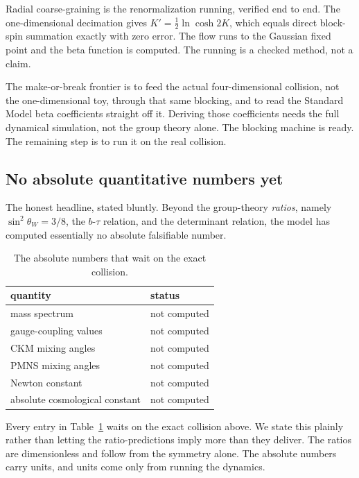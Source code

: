 \begin{result}
Radial coarse-graining is the renormalization running, verified end to end. The one-dimensional decimation gives $K' = \tfrac{1}{2}\ln\cosh 2K$, which equals direct block-spin summation exactly with zero error. The flow runs to the Gaussian fixed point and the beta function is computed. The running is a checked method, not a claim.
\end{result}

The make-or-break frontier is to feed the actual four-dimensional collision, not the one-dimensional toy, through that same blocking, and to read the Standard Model beta coefficients straight off it. Deriving those coefficients needs the full dynamical simulation, not the group theory alone. The blocking machine is ready. The remaining step is to run it on the real collision.

\subsection{No absolute quantitative numbers yet}

The honest headline, stated bluntly. Beyond the group-theory \emph{ratios}, namely $\sin^2\theta_W = 3/8$, the $b$-$\tau$ relation, and the determinant relation, the model has computed essentially no absolute falsifiable number.

\begin{table}[ht]
\centering
\begin{tabular}{@{}ll@{}}
\toprule
quantity & status \\
\midrule
mass spectrum & not computed \\
gauge-coupling values & not computed \\
CKM mixing angles & not computed \\
PMNS mixing angles & not computed \\
Newton constant & not computed \\
absolute cosmological constant & not computed \\
\bottomrule
\end{tabular}
\caption{The absolute numbers that wait on the exact collision.}
\label{tab:absolute-numbers}
\end{table}

Every entry in Table~\ref{tab:absolute-numbers} waits on the exact collision above. We state this plainly rather than letting the ratio-predictions imply more than they deliver. The ratios are dimensionless and follow from the symmetry alone. The absolute numbers carry units, and units come only from running the dynamics.

